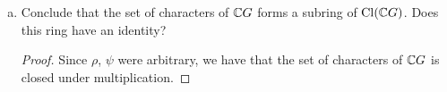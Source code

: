 \documentclass[11pt, reqno]{amsart}
\theoremstyle{plain}
\theoremstyle{definition}
\theoremstyle{example}
\def\tr{\mathrm{tr}}
\begin{document}
\begin{enumerate}[I ]
\begin{enumerate}[1.]
\begin{enumerate}[(a)]
\begin{proof}
Fix $g \in G$. Then,
\begin{align*}
\chi_\rho(g) &= \tr(\rho(g))\\
&= \sum_{i = 1}^m \alpha_{ii}
\end{align*}

and,
\begin{align*}
\chi_\psi(g) &= \tr(\psi(g))\\
&= \sum_{i=1}^n \beta_{ii}
\end{align*}

Thus, we have,
\begin{align*}
\chi_\rho(g) \chi_\psi(g) &= (\chi_{\rho} \chi_{\psi})(g)\\
&= \sum_{i = 1}^m \alpha_{ii} \cdot \sum_{j = 1}^n\beta_{jj}\\
&= \sum_{i=1}^m \sum_{j=1}^n = \alpha_{ii} \beta_{jj}
\end{align*}

Lastly, using the matrix derived in part (a), we have,
\begin{align*}
\chi_{\rho\otimes\psi}(g) &= \tr( \alpha_{1,1} \psi(g) + \alpha_{2, 2} \psi(g) + \cdots + \alpha_{m,m} \psi(g))\\
&= \tr( \alpha_{1,1} \psi(g)) + \tr(\alpha_{2, 2} \psi(g)) + \cdots + \tr(\alpha_{m,m} \psi(g))\\
&= \alpha_{1,1} \tr(\psi(g)) + \alpha_{2,2} \tr(\psi(g)) + \cdots + \alpha_{m,m} \tr(\psi(g))\\
&= \alpha_{1,1} \sum_{i=1}^n \beta_{ii} + \alpha_{2,2} \sum_{i=1}^n \beta_{ii} + \cdots + \alpha_{m,m} \sum_{i=1}^n \beta_{ii}\\
&= \sum_{i=1}^m \sum_{j=1}^n = \alpha_{ii} \beta_{jj}\\
&= \chi_\rho(g) \chi_\psi(g)
\end{align*}

as required.
\end{proof}

\item Conclude that the set of characters of $\mathbb{C} G$ forms a subring of $\mathrm{Cl}(\mathbb{C} G)$. Does this ring have an identity?

\begin{proof}
Since $\rho$, $\psi$ were arbitrary, we have that the set of characters of $\mathbb{C} G$ is closed under multiplication.
\end{proof}

\end{enumerate}


\end{enumerate}
\end{enumerate}
\end{document}
